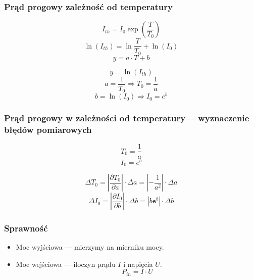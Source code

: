 \documentclass[xcolor={dvipsnames,table}]{beamer}
\begin{document}
\begin{frame}
\frametitle{Prąd progowy zależność od temperatury}

\begin{equation*}
I_{th} = I_0 \exp \left( \frac{T}{T_0} \right)
\end{equation*}
\begin{equation*}
\ln (I_{th}) =  \ln \frac{T}{T_0}  + \ln(I_{0})
\end{equation*}
\begin{equation*}
y = a \cdot T + b
\end{equation*}

\begin{equation*}
y = \ln(I_{th})
\end{equation*}
\begin{equation*}
a = \frac{1}{T_0} \Rightarrow T_0 = \frac{1}{a}
\end{equation*}
\begin{equation*}
b = \ln(I_0) \Rightarrow I_0 = e^b
\end{equation*}
\end{frame}

\begin{frame}
\frametitle{Prąd progowy   w zależności od temperatury--- wyznaczenie błędów pomiarowych}
\center
\begin{equation*}
T_0 = \frac{1}{a}
\end{equation*}
\begin{equation*}
I_0 = e^b
\end{equation*}


\begin{equation*}
\Delta T_0 = \left\lvert \frac{\partial T_{0}}{\partial a} \right\rvert \cdot \Delta a = \left\lvert -\frac{1}{a^2} \right\rvert \cdot \Delta a
\end{equation*}
\begin{equation*}
\Delta I_0 = \left\lvert \frac{\partial I_{0}}{\partial b} \right\rvert \cdot \Delta b = | b \mathtt{e}^b | \cdot \Delta b
\end{equation*}

\end{frame}

\begin{frame}
\frametitle{Sprawność}
\begin{itemize}
\item Moc wyjściowa  ---  mierzymy na mierniku mocy.
\item Moc wejściowa --- iloczyn prądu $I$ i napięcia $U$.
\begin{equation*}
P_{in} = I \cdot U
\end{equation*}
\end{itemize}
\end{frame}
\end{document}
